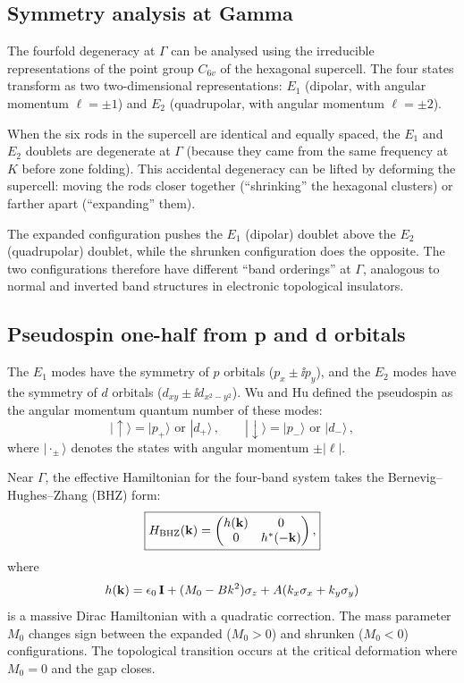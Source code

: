 \subsection{Symmetry analysis at Gamma}
\label{sec:ch11-symmetry-gamma}

The fourfold degeneracy at $\Gamma$ can be analysed using the
irreducible representations of the point group $C_{6v}$ of the
hexagonal supercell.  The four states transform as two
two-dimensional representations: $E_1$ (dipolar, with angular momentum
$\ell=\pm 1$) and $E_2$ (quadrupolar, with angular momentum
$\ell=\pm 2$).

When the six rods in the supercell are identical and equally spaced,
the $E_1$ and $E_2$ doublets are degenerate at $\Gamma$ (because they
came from the same frequency at $K$ before zone folding).  This
accidental degeneracy can be lifted by deforming the supercell: moving
the rods closer together (``shrinking'' the hexagonal clusters) or
farther apart (``expanding'' them).

The expanded configuration pushes the $E_1$ (dipolar) doublet above the
$E_2$ (quadrupolar) doublet, while the shrunken configuration does the
opposite.  The two configurations therefore have different ``band
orderings'' at $\Gamma$, analogous to normal and inverted band
structures in electronic topological insulators.

\subsection{Pseudospin one-half from p and d orbitals}
\label{sec:ch11-pd-pseudospin}

The $E_1$ modes have the symmetry of $p$ orbitals ($p_x\pm\ii p_y$),
and the $E_2$ modes have the symmetry of $d$ orbitals
($d_{xy}\pm\ii d_{x^2-y^2}$).  Wu and Hu defined the pseudospin as the
angular momentum quantum number of these modes:
\begin{equation}\label{eq:ch11-pseudospin-pd}
  |\uparrow\rangle = |p_+\rangle \text{ or } |d_+\rangle\,,\qquad
  |\downarrow\rangle = |p_-\rangle \text{ or } |d_-\rangle\,,
\end{equation}
where $|\cdot_\pm\rangle$ denotes the states with angular momentum
$\pm|\ell|$.

Near $\Gamma$, the effective Hamiltonian for the four-band system takes
the Bernevig--Hughes--Zhang (BHZ) form:
\begin{equation}\label{eq:ch11-bhz}
  \boxed{%
  H_{\mathrm{BHZ}}(\kvec) = \begin{pmatrix}
    h(\kvec) & 0 \\ 0 & h^*(-\kvec)
  \end{pmatrix},}
\end{equation}
where
\begin{equation}\label{eq:ch11-bhz-block}
  h(\mathbf{k}) = \epsilon_0\,\mathbf{I}
  + (M_0 - Bk^2)\sigma_z
  + A(k_x\sigma_x + k_y\sigma_y)
\end{equation}
is a massive Dirac Hamiltonian with a quadratic correction.  The mass
parameter $M_0$ changes sign between the expanded ($M_0>0$) and
shrunken ($M_0<0$) configurations.  The topological transition occurs
at the critical deformation where $M_0=0$ and the gap closes.

